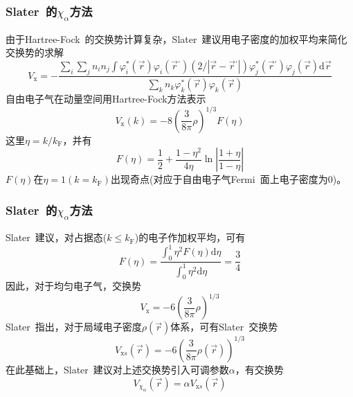 \documentclass[cjk,slidestop,compress,mathserif,blue]{beamer}
\begin{document}
\frame
{
	\frametitle{\textrm{Slater~}的$\chi_{\alpha}$方法}
	由于\textrm{Hartree-Fock~}的交换势计算复杂，\textrm{Slater~}建议用电子密度的加权平均来简化交换势的求解
	\begin{displaymath}
		V_{\mathrm x}=-\frac{\sum\limits_i\sum\limits_jn_in_j\int\varphi_i^{\ast}(\vec r)\varphi_i(\vec r{}^{\prime})(2/|\vec r-\vec r{}^{\prime}|)\varphi_j^{\ast}(\vec r{}^{\prime})\varphi_j(\vec r)\mathrm{d}\vec r}{\sum\limits_kn_k\varphi_k^{\ast}(\vec r)\varphi_k(\vec r)}
	\end{displaymath}
	自由电子气在动量空间用\textrm{Hartree-Fock}方法表示
	\begin{displaymath}
		V_{\mathrm x}(k)=-8\left( \frac3{8\pi}\rho \right)^{1/3}F(\eta)
	\end{displaymath}
	这里$\eta=k/k_{\mathrm F}$，并有
	\begin{displaymath}
		F(\eta)=\frac12+\frac{1-\eta^2}{4\eta}\ln\left|\frac{1+\eta}{1-\eta}\right|
	\end{displaymath}
	$F(\eta)$在$\eta=1(k=k_{\mathrm F})$出现奇点(对应于自由电子气\textrm{Fermi~}面上电子密度为0)。
}
	
\frame
{
	\frametitle{\textrm{Slater~}的$\chi_{\alpha}$方法}
	\textrm{Slater~}建议，对占据态($k\leqslant k_{\mathrm F}$)的电子作加权平均，可有
	\begin{displaymath}
		F(\eta)=\frac{\int_0^1\eta^2F(\eta)\mathrm{d}\eta}{\int_0^1\eta^2\mathrm{d}\eta}=\frac34
	\end{displaymath}
	因此，对于均匀电子气，交换势
	\begin{displaymath}
		V_{\mathrm x}=-6\left( \frac3{8\pi}\rho \right)^{1/3}
	\end{displaymath}
	\textrm{Slater~}指出，对于局域电子密度$\rho(\vec r)$体系，可有\textrm{Slater~}交换势
	\begin{displaymath}
		V_{\mathrm xs}(\vec r)=-6\left( \frac3{8\pi}\rho(\vec r) \right)^{1/3}
	\end{displaymath}
	在此基础上，\textrm{Slater~}建议对上述交换势引入可调参数$\alpha$，有交换势
	\begin{displaymath}
		V_{\chi_{\alpha}}(\vec r)=\alpha V_{\mathrm xs}(\vec r)
	\end{displaymath}
}
\end{document}
